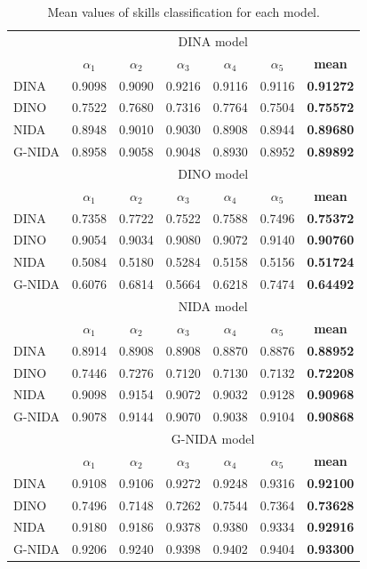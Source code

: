 \documentclass[english]{pwr_wmat_praca_dyplomowa}
\theoremstyle{plain}
\theoremstyle{definition}
\numberwithin{theorem}{chapter}
\begin{document}
\begin{table}[H]
	\centering
	\begin{tabular}{l c c c c c c} 
		\hline
		{\rule{0pt}{3ex}} & \multicolumn{6}{c}{DINA model} \\ 
		& $\alpha_1$ & $\alpha_2$ & $\alpha_3$ & $\alpha_4$ & $\alpha_5$ & \textbf{mean} \\ [0.5ex]
		\hline 
		{\rule{0pt}{3ex}}DINA & 0.9098 & 0.9090 & 0.9216 & 0.9116 & 0.9116 & \textbf{0.91272} \\ 
		DINO & 0.7522 & 0.7680 & 0.7316 & 0.7764 & 0.7504 & \textbf{0.75572} \\
		NIDA & 0.8948 & 0.9010 & 0.9030 & 0.8908 & 0.8944 & \textbf{0.89680} \\
		G-NIDA & 0.8958 & 0.9058 & 0.9048 & 0.8930 & 0.8952 & \textbf{ 0.89892} \\ [0.5ex] 
		\hline
		{\rule{0pt}{3ex}} & \multicolumn{6}{c}{DINO model} \\ 
		& $\alpha_1$ & $\alpha_2$ & $\alpha_3$ & $\alpha_4$ & $\alpha_5$ & \textbf{mean} \\ [0.5ex]
		\hline 
		{\rule{0pt}{3ex}}DINA & 0.7358 & 0.7722 & 0.7522 & 0.7588 & 0.7496 & \textbf{0.75372} \\ 
		DINO & 0.9054 & 0.9034 & 0.9080 & 0.9072 & 0.9140 & \textbf{0.90760} \\
		NIDA & 0.5084 & 0.5180 & 0.5284 & 0.5158 & 0.5156 & \textbf{0.51724} \\
		G-NIDA & 0.6076 & 0.6814 & 0.5664 & 0.6218 & 0.7474 & \textbf{ 0.64492} \\ [0.5ex] 
		\hline
		{\rule{0pt}{3ex}} & \multicolumn{6}{c}{NIDA model} \\ 
		& $\alpha_1$ & $\alpha_2$ & $\alpha_3$ & $\alpha_4$ & $\alpha_5$ & \textbf{mean} \\ [0.5ex]
		\hline 
		{\rule{0pt}{3ex}}DINA & 0.8914 & 0.8908 & 0.8908 & 0.8870 & 0.8876 & \textbf{0.88952} \\ 
		DINO & 0.7446 & 0.7276 & 0.7120 & 0.7130 & 0.7132 & \textbf{0.72208} \\
		NIDA & 0.9098 & 0.9154 & 0.9072 & 0.9032 & 0.9128 & \textbf{0.90968} \\
		G-NIDA & 0.9078 & 0.9144 & 0.9070 & 0.9038 & 0.9104 & \textbf{ 0.90868} \\ [0.5ex] 
		\hline
		{\rule{0pt}{3ex}} & \multicolumn{6}{c}{G-NIDA model} \\ 
		& $\alpha_1$ & $\alpha_2$ & $\alpha_3$ & $\alpha_4$ & $\alpha_5$ & \textbf{mean} \\ [0.5ex]
		\hline 
		{\rule{0pt}{3ex}}DINA & 0.9108 & 0.9106 & 0.9272 & 0.9248 & 0.9316 & \textbf{0.92100} \\ 
		DINO & 0.7496 & 0.7148 & 0.7262 & 0.7544 & 0.7364 & \textbf{0.73628} \\
		NIDA & 0.9180 & 0.9186 & 0.9378 & 0.9380 & 0.9334 & \textbf{0.92916} \\
		G-NIDA & 0.9206 & 0.9240 & 0.9398 & 0.9402 & 0.9404 & \textbf{ 0.93300} \\ [0.5ex] 
		\hline
	\end{tabular}
	\caption{Mean values of skills classification for each model.}
	\label{tab:estimation_skills} 
\end{table}
\end{document}
